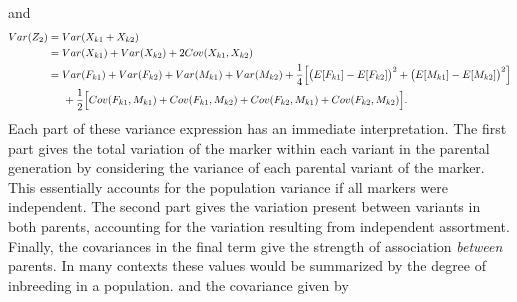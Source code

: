 \documentclass{article}
\begin{document}
and
\begin{align*}
  Var(Z_2) & = Var(X_{k1} + X_{k2}) \\
           & = Var(X_{k1}) + Var(X_{k2}) + 2 Cov(X_{k1}, X_{k2}) \\
           & = Var(F_{k1}) + Var(F_{k2}) + Var(M_{k1}) + Var(M_{k2}) + \frac{1}{4} \Big [ \big ( E[F_{k1}] - E[F_{k2}] \big )^2 + \big ( E[M_{k1}] - E[M_{k2}] \big )^2 \Big ] \\
  & \hspace{0.5cm} + \frac{1}{2} \Big [ Cov(F_{k1}, M_{k1}) + Cov(F_{k1}, M_{k2}) + Cov(F_{k2}, M_{k1}) + Cov(F_{k2}, M_{k2}) \Big ].
\end{align*}
Each part of these variance expression has an immediate interpretation. The first part gives the total variation of the marker within each variant in the parental generation by considering the variance of each parental variant of the marker. This essentially accounts for the population variance if all markers were independent. The second part gives the variation present between variants in both parents, accounting for the variation resulting from independent assortment. Finally, the covariances in the final term give the strength of association \emph{between} parents. In many contexts these values would be summarized by the degree of inbreeding in a population.
and the covariance given by
\end{document}
